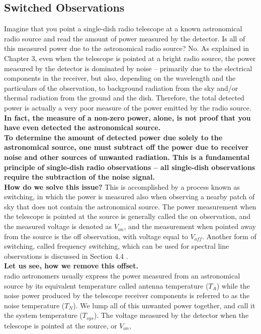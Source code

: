 \documentclass[10pt]{report}
\begin{document}
\subsection{Switched Observations}
Imagine that you point a single-dish radio telescope at a known astronomical radio source and read the amount of power measured by the detector.  Is all of this measured power due to the astronomical radio source?  No.  As explained in Chapter 3, even when the telescope is pointed at a bright radio source, the power measured by the detector is dominated by noise -- primarily due to the electrical components in the receiver, but also, depending on the wavelength and the particulars of the observation, to background radiation from the sky and/or thermal radiation from the ground and the dish.  Therefore, the total detected power is actually a very poor measure of the power emitted by the radio source. \textbf{ In fact, the measure of a non-zero power, alone, is not proof that you have even detected the astronomical source.}\\
\textbf{To determine the amount of detected power due solely to the astronomical source, one must subtract off the power due to receiver noise and other sources of unwanted radiation.  This is a fundamental principle of single-dish radio observations -- all single-dish observations require the subtraction of the noise signal. }\\
\textbf{How do we solve this issue?}
This is accomplished by a process known as switching, in which the power is measured also when observing a nearby patch of sky that does not contain the astronomical source.  The power measurement when the telescope is pointed at the source is generally called the on observation, and the measured voltage is denoted as $V_{on}$, and the measurement when pointed away from the source is the off observation, with voltage equal to $V_{off}$. Another form of switching, called frequency switching, which can be used for spectral line observations is discussed in Section 4.4 .\\
\textbf{Let us see, how we remove this offset.}\\
 radio astronomers usually express the power measured from an astronomical source by its equivalent temperature called antenna temperature ($T_A$) while the noise power produced by the telescope receiver components is referred to as the noise temperature ($T_N$).   We lump all of this unwanted power together, and call it the system temperature ($T_{sys}$).  The voltage measured by the detector when the telescope is pointed at the source, or $V_{on}$,
\end{document}
